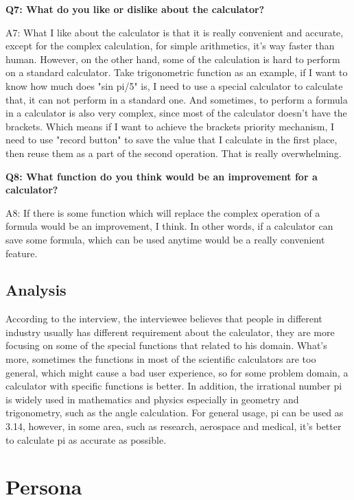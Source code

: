 \documentclass[12pt]{report}
\begin{document}
{\textbf{Q7: What do you like or dislike about the calculator?}

A7: What I like about the calculator is that it is really convenient and accurate, except for the complex calculation, for simple arithmetics, it's way faster than human.  However, on the other hand, some of the calculation is hard to perform on a standard calculator. Take trigonometric function as an example, if I want to know how much does "sin pi/5" is, I need to use a special calculator to calculate that, it can not perform in a standard one. And sometimes, to perform a formula in a calculator is also very complex, since most of the calculator doesn't have the brackets. Which means if I want to achieve the brackets priority mechanism, I need to use "record button" to save the value that I calculate in the first place, then reuse them as a part of the second operation. That is really overwhelming.

\textbf{Q8: What function do you think would be an improvement for a calculator?}

A8: If there is some function which will replace the complex operation of a formula would be an improvement, I think. In other words,  if a calculator can save some formula, which can be used anytime would be a really convenient feature. 


\section{Analysis}
According to the interview, the interviewee believes that people in different industry usually has different requirement about the calculator, they are more focusing on some of the special functions that related to his domain. What's more, sometimes the functions in most of the scientific calculators are too general, which might cause a bad user experience, so for some problem domain, a calculator with specific functions is better. In addition, the irrational number pi is widely used in mathematics and physics especially in geometry and trigonometry, such as the angle calculation. For general usage, pi can be used as 3.14, however, in some area, such as research, aerospace and medical, it's better to calculate pi as accurate as possible.


\chapter{Persona}
}
\end{document}

